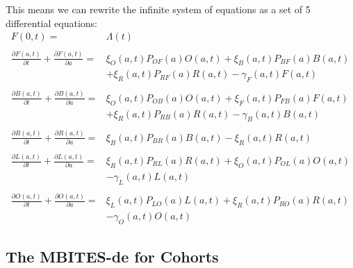\documentclass{article}
\begin{document}
This means we can rewrite the infinite system of equations as a
set of 5 differential equations: 
%
\begin{equation}\begin{array}{rl}
F(0,t) =& \Lambda(t) \\ 
%
&\\
\frac{\partial F(a,t)}{\partial t} + \frac{\partial F(a,t)}{\partial a} =& 
\xi_O(a,t) P_{OF}(a) O(a,t) 
+ \xi_B(a,t) P_{BF}(a) B(a,t) \\&
 + \xi_R(a,t) P_{RF}(a) R(a,t)
- \gamma_F(a,t) F(a,t) \\
%
%
&\\
\frac{\partial B(a,t)}{\partial t} + \frac{\partial B(a,t)}{\partial a} =&  \xi_O(a,t) P_{OB}(a) O(a,t) + \xi_F(a,t) P_{FB}(a) F(a,t) \\ & 
+ \xi_R(a,t) P_{RB}(a) R(a,t) 
- \gamma_B(a,t) B(a,t)\\
%
&\\
\frac{\partial R(a,t)}{\partial t} + \frac{\partial R(a,t)}{\partial a} =&  \xi_B(a,t) P_{BR}(a) B(a,t) - \xi_R(a,t) R(a,t)\\ 
%
&\\
\frac{\partial L(a,t)}{\partial t} + \frac{\partial L(a,t)}{\partial a} =& \xi_R(a,t) P_{RL}(a) R(a,t) + 
\xi_O(a,t) P_{OL}(a) O(a,t) \\&
- \gamma_L(a,t) L(a,t)
\\ 
%
&\\
\frac{\partial O(a,t)}{\partial t} + \frac{\partial O(a,t)}{\partial a} =& \xi_L(a,t) P_{LO}(a) L(a,t) 
+ \xi_R(a,t) P_{RO}(a) R(a,t)  
\\&
- \gamma_O(a,t) O(a,t)

%
\end{array}\end{equation}


\subsection{The MBITES-de for Cohorts}
\end{document}
